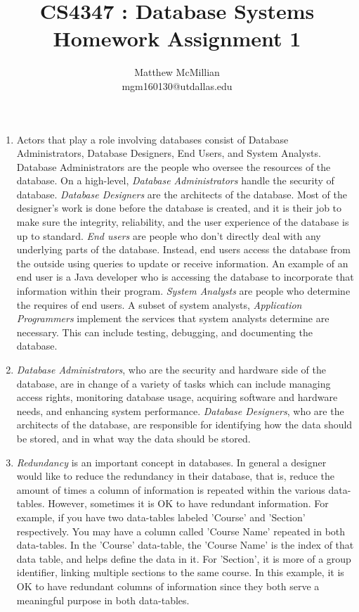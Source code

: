 \documentclass[12pt]{article}
\begin{document}
\title{CS4347 : Database Systems\\Homework Assignment 1}
\author{Matthew McMillian\\mgm160130@utdallas.edu}
\maketitle



\begin{enumerate}
	
	\item Actors that play a role involving databases consist of Database Administrators, Database Designers, End Users, and System Analysts. Database Administrators are the people who oversee the resources of the database. On a high-level, \textit{Database Administrators} handle the security of database. \textit{Database Designers} are the architects of the database. Most of the designer's work is done before the database is created, and it is their job to make sure the integrity, reliability, and the user experience of the database is up to standard. \textit{End users} are people who don't directly deal with any underlying parts of the database. Instead, end users access the database from the outside using queries to update or receive information. An example of an end user is a Java developer who is accessing the database to incorporate that information within their program. \textit{System Analysts} are people who determine the requires of end users. A subset of system analysts, \textit{Application Programmers} implement the services that system analysts determine are necessary. This can include testing, debugging, and documenting the database.
	
	\item \textit{Database Administrators}, who are the security and hardware side of the database, are in change of a variety of tasks which can include managing access rights, monitoring database usage, acquiring software and hardware needs, and enhancing system performance. \textit{Database Designers}, who are the architects of the database, are responsible for identifying how the data should be stored, and in what way the data should be stored.
	
	\item \textit{Redundancy} is an important concept in databases. In general a designer would like to reduce the redundancy in their database, that is, reduce the amount of times a column of information is repeated within the various data-tables. However, sometimes it is OK to have redundant information. For example, if you have two data-tables labeled 'Course' and 'Section' respectively. You may have a column called 'Course Name' repeated in both data-tables. In the 'Course' data-table, the 'Course Name' is the index of that data table, and  helps define the data in it. For 'Section', it is more of a group identifier, linking multiple sections to the same course. In this example, it is OK to have redundant columns of information since they both serve a meaningful purpose in both data-tables.
	

\end{enumerate}
\end{document}
